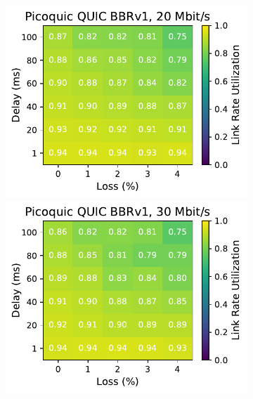 \begin{figure}[ht]
\begin{subfigure}[b]{0.22\linewidth}
        \includegraphics[width=\linewidth,trim={0 0 2cm 0},clip]{splitting-paper/figures/heatmaps/heatmap_picoquic_bbr1_20mbps.pdf}
        \includegraphics[width=\linewidth,trim={0 0 2cm 0},clip]{splitting-paper/figures/heatmaps/heatmap_picoquic_bbr1_30mbps.pdf}

\end{subfigure}
\end{figure}
